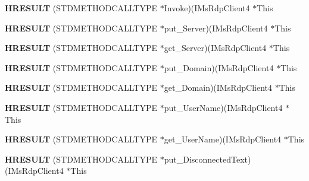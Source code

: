 \begin{DoxyCompactItemize}
\item 
\mbox{\label{struct_i_ms_rdp_client4_vtbl_a5ed5c44657fe01e5ff5f15e66b521964}} 
{\bfseries H\+R\+E\+S\+U\+LT} (S\+T\+D\+M\+E\+T\+H\+O\+D\+C\+A\+L\+L\+T\+Y\+PE $\ast$Invoke)(I\+Ms\+Rdp\+Client4 $\ast$This
\item 
\mbox{\label{struct_i_ms_rdp_client4_vtbl_a7c030ad62989d33535308bc91c15fb70}} 
{\bfseries H\+R\+E\+S\+U\+LT} (S\+T\+D\+M\+E\+T\+H\+O\+D\+C\+A\+L\+L\+T\+Y\+PE $\ast$put\+\_\+\+Server)(I\+Ms\+Rdp\+Client4 $\ast$This
\item 
\mbox{\label{struct_i_ms_rdp_client4_vtbl_af45d7f1aea88a874ebcb9b264478d1af}} 
{\bfseries H\+R\+E\+S\+U\+LT} (S\+T\+D\+M\+E\+T\+H\+O\+D\+C\+A\+L\+L\+T\+Y\+PE $\ast$get\+\_\+\+Server)(I\+Ms\+Rdp\+Client4 $\ast$This
\item 
\mbox{\label{struct_i_ms_rdp_client4_vtbl_ac4083374db63daa0e2e5a6b3e99e4ead}} 
{\bfseries H\+R\+E\+S\+U\+LT} (S\+T\+D\+M\+E\+T\+H\+O\+D\+C\+A\+L\+L\+T\+Y\+PE $\ast$put\+\_\+\+Domain)(I\+Ms\+Rdp\+Client4 $\ast$This
\item 
\mbox{\label{struct_i_ms_rdp_client4_vtbl_a71e895609379b0856864af17e96296cb}} 
{\bfseries H\+R\+E\+S\+U\+LT} (S\+T\+D\+M\+E\+T\+H\+O\+D\+C\+A\+L\+L\+T\+Y\+PE $\ast$get\+\_\+\+Domain)(I\+Ms\+Rdp\+Client4 $\ast$This
\item 
\mbox{\label{struct_i_ms_rdp_client4_vtbl_a2ab53362d660bbcf3670e6b2f21f4d7e}} 
{\bfseries H\+R\+E\+S\+U\+LT} (S\+T\+D\+M\+E\+T\+H\+O\+D\+C\+A\+L\+L\+T\+Y\+PE $\ast$put\+\_\+\+User\+Name)(I\+Ms\+Rdp\+Client4 $\ast$This
\item 
\mbox{\label{struct_i_ms_rdp_client4_vtbl_af84eb421d0b2138248a046960cd4bde7}} 
{\bfseries H\+R\+E\+S\+U\+LT} (S\+T\+D\+M\+E\+T\+H\+O\+D\+C\+A\+L\+L\+T\+Y\+PE $\ast$get\+\_\+\+User\+Name)(I\+Ms\+Rdp\+Client4 $\ast$This
\item 
\mbox{\label{struct_i_ms_rdp_client4_vtbl_aab3ef23b756d8821be36ae59bf4f9d59}} 
{\bfseries H\+R\+E\+S\+U\+LT} (S\+T\+D\+M\+E\+T\+H\+O\+D\+C\+A\+L\+L\+T\+Y\+PE $\ast$put\+\_\+\+Disconnected\+Text)(I\+Ms\+Rdp\+Client4 $\ast$This

\end{DoxyCompactItemize}
